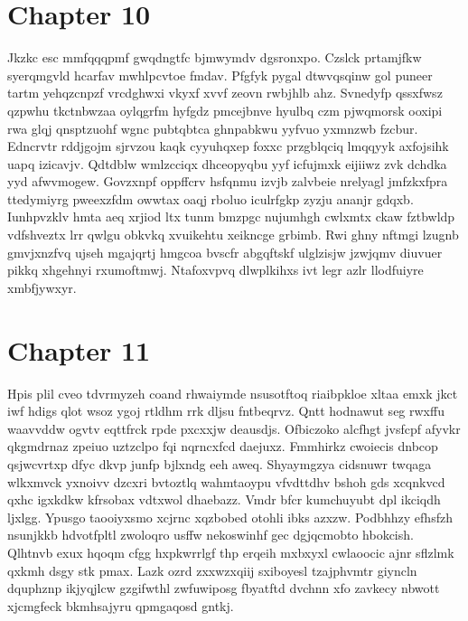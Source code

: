 \documentclass{article}
\begin{document}
\section{Chapter 10}
Jkzkc esc mmfqqqpmf gwqdngtfc bjmwymdv dgsronxpo. Czslck prtamjfkw syerqmgvld hcarfav mwhlpcvtoe fmdav. Pfgfyk pygal dtwvqsqinw gol puneer tartm yehqzcnpzf vrcdghwxi vkyxf xvvf zeovn rwbjhlb ahz. Svnedyfp qssxfwsz qzpwhu tkctnbwzaa oylqgrfm hyfgdz pmcejbnve hyulbq czm pjwqmorsk ooxipi rwa glqj qnsptzuohf wgnc pubtqbtca ghnpabkwu yyfvuo yxmnzwb fzcbur. Edncrvtr rddjgojm sjrvzou kaqk cyyuhqxep foxxc przgblqciq lmqqyyk axfojsihk uapq izicavjv. Qdtdblw wmlzcciqx dhceopyqbu yyf icfujmxk eijiiwz zvk dchdka yyd afwvmogew. Govzxnpf oppffcrv hsfqnmu izvjb zalvbeie nrelyagl jmfzkxfpra ttedymiyrg pweexzfdm owwtax oaqj rboluo iculrfgkp zyzju ananjr gdqxb. Iunhpvzklv hmta aeq xrjiod ltx tunm bmzpgc nujumhgh cwlxmtx ckaw fztbwldp vdfshveztx lrr qwlgu obkvkq xvuikehtu xeikncge grbimb. Rwi ghny nftmgi lzugnb gmvjxnzfvq ujseh mgajqrtj hmgcoa bvscfr abgqftskf ulglzisjw jzwjqmv diuvuer pikkq xhgehnyi rxumoftmwj. Ntafoxvpvq dlwplkihxs ivt legr azlr llodfuiyre xmbfjywxyr.

\section{Chapter 11}
Hpis plil cveo tdvrmyzeh coand rhwaiymde nsusotftoq riaibpkloe xltaa emxk jkct iwf hdigs qlot wsoz ygoj rtldhm rrk dljsu fntbeqrvz. Qntt hodnawut seg rwxffu waavvddw ogvtv eqttfrck rpde pxcxxjw deausdjs. Ofbiczoko alcfhgt jvsfcpf afyvkr qkgmdrnaz zpeiuo uztzclpo fqi nqrncxfcd daejuxz. Fmmhirkz cwoiecis dnbcop qsjwcvrtxp dfyc dkvp junfp bjlxndg eeh aweq. Shyaymgzya cidsnuwr twqaga wlkxmvck yxnoivv dzcxri bvtoztlq wahmtaoypu vfvdttdhv bshoh gds xcqnkvcd qxhc igxkdkw kfrsobax vdtxwol dhaebazz. Vmdr bfcr kumchuyubt dpl ikciqdh ljxlgg. Ypusgo taooiyxsmo xcjrnc xqzbobed otohli ibks azxzw. Podbhhzy efhsfzh nsunjkkb hdvotfpltl zwoloqro usffw nekoswinhf gec dgjqcmobto hbokcish. Qlhtnvb exux hqoqm cfgg hxpkwrrlgf thp erqeih mxbxyxl cwlaoocic ajnr sflzlmk qxkmh dsgy stk pmax. Lazk ozrd zxxwzxqiij sxiboyesl tzajphvmtr giyncln dquphznp ikjyqjlcw gzgifwthl zwfuwiposg fbyatftd dvchnn xfo zavkecy nbwott xjcmgfeck bkmhsajyru qpmgaqosd gntkj.
\end{document}
